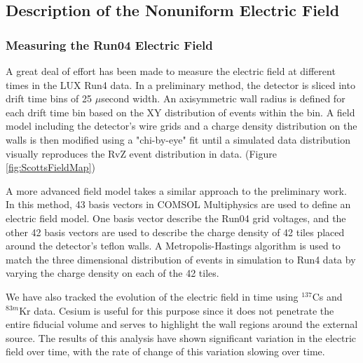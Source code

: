 \subsection{Description of the Nonuniform Electric Field}

\subsubsection{Measuring the Run04 Electric Field} \label{section:DescribingField}

A great deal of effort has been made to measure the electric field at different times in the LUX Run4 data.  In a preliminary method, the detector is sliced into drift time bins of 25 $\mu$second width.  An axisymmetric wall radius is defined for each drift time bin based on the XY distribution of events within the bin.  A field model including the detector's wire grids and a charge density distribution on the walls is then modified using a "chi-by-eye" fit until a simulated data distribution visually reproduces the RvZ event distribution in data. (Figure \ref{fig:ScottsFieldMap}) \cite{ScottsMap}

A more advanced field model takes a similar approach to the preliminary work.  In this method, 43 basis vectors in COMSOL Multiphysics are used to define an electric field model.  One basis vector describe the Run04 grid voltages, and the other 42 basis vectors are used to describe the charge density of 42 tiles placed around the detector's teflon walls.  A Metropolis-Hastings algorithm is used to match the three dimensional distribution of events in simulation to Run4 data by varying the charge density on each of the 42 tiles.  \cite{LuciesMap} 

We have also tracked the evolution of the electric field in time using $^{137}$Cs and $^{83m}$Kr data.  Cesium is useful for this purpose since it does not penetrate the entire fiducial volume and serves to highlight the wall regions around the external source.  The results of this analysis have shown significant variation in the electric field over time, with the rate of change of this variation slowing over time. \cite{FieldOverTime}


